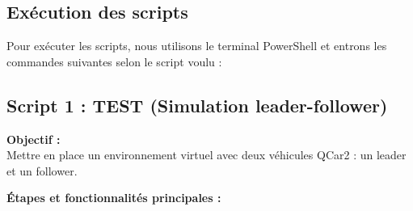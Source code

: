 \documentclass[12pt, a4paper]{report}
\begin{document}
\subsection{Exécution des scripts}
Pour exécuter les scripts, nous utilisons le terminal PowerShell et entrons les commandes suivantes selon le script voulu :


\subsection{Script 1 : TEST (Simulation leader-follower)}

\textbf{Objectif :} \\
Mettre en place un environnement virtuel avec deux véhicules QCar2 : un leader et un follower.

\textbf{Étapes et fonctionnalités principales :}
\end{document}
